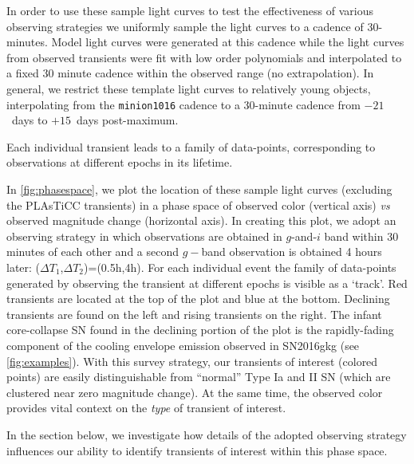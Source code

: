 \documentclass[letterpaper,longauthor,trackchanges,twocolumn,onecolappendix,sort&compress]{aastex62}
\newcommand{\dtone}{\ensuremath{\Delta T_1}}
\newcommand{\dttwo}{\ensuremath{\Delta T_2}}
\begin{document}
In order to use these sample light curves to test the effectiveness of various observing strategies we uniformly sample the light curves to a cadence of 30-minutes. Model light curves were generated at this cadence while the light curves from observed transients were fit with low order polynomials and interpolated to a fixed 30 minute cadence within the observed range (no extrapolation). In general, we restrict these template light curves to relatively young objects, interpolating from the \texttt{minion1016} cadence to a 30-minute cadence from $-21$~days to $+15$~days post-maximum.

Each individual transient leads to a family of data-points, corresponding to observations at different epochs in its lifetime.

In \autoref{fig:phasespace}, we plot the location of these sample light curves (excluding the PLAsTiCC transients) in a phase space of observed color (vertical axis) \emph{vs} observed magnitude change (horizontal axis). In creating this plot, we adopt an observing strategy in which observations are obtained in $g$-and-$i$ band within 30 minutes of each other and a second $g-$band observation is obtained 4 hours later:  (\dtone,\dttwo)=(0.5h,4h).
For each individual event the family of data-points generated by observing the transient at different epochs is visible as a `track'. 
Red transients are located at the top of the plot and blue at the bottom. Declining transients are found on the left and rising transients on the right. The infant core-collapse SN found in the declining portion of the plot is the rapidly-fading component of the cooling envelope emission observed in SN2016gkg (see \autoref{fig:examples}). With this survey strategy, our transients of interest (colored points) are easily distinguishable from ``normal'' Type Ia and II SN (which are clustered near zero magnitude change). At the same time, the observed color provides vital context on the \emph{type} of transient of interest. 

In the section below, we investigate how details of the adopted observing strategy influences our ability to identify transients of interest within this phase space.

\end{document}
